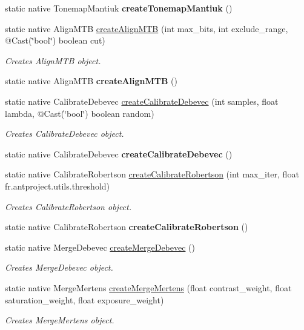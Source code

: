 \begin{DoxyCompactItemize}
static native Tonemap\+Mantiuk {\bfseries create\+Tonemap\+Mantiuk} ()
\item 
static native Align\+M\+TB \hyperlink{group__photo__hdr_ga07eeedb34057b6d4d7c8679fda18175f}{create\+Align\+M\+TB} (int max\+\_\+bits, int exclude\+\_\+range, @Cast(\char`\"{}bool\char`\"{}) boolean cut)
\begin{DoxyCompactList}\small\item\em Creates Align\+M\+TB object. \end{DoxyCompactList}\item 
static native Align\+M\+TB {\bfseries create\+Align\+M\+TB} ()
\item 
static native Calibrate\+Debevec \hyperlink{group__photo__hdr_gada8b25f072e80141d53f66754675dbec}{create\+Calibrate\+Debevec} (int samples, float lambda, @Cast(\char`\"{}bool\char`\"{}) boolean random)
\begin{DoxyCompactList}\small\item\em Creates Calibrate\+Debevec object. \end{DoxyCompactList}\item 
static native Calibrate\+Debevec {\bfseries create\+Calibrate\+Debevec} ()
\item 
static native Calibrate\+Robertson \hyperlink{group__photo__hdr_ga1ac32f0f1042b3436bd7daf88bb48760}{create\+Calibrate\+Robertson} (int max\+\_\+iter, float fr.antproject.utils.threshold)
\begin{DoxyCompactList}\small\item\em Creates Calibrate\+Robertson object. \end{DoxyCompactList}\item 
static native Calibrate\+Robertson {\bfseries create\+Calibrate\+Robertson} ()
\item 
static native Merge\+Debevec \hyperlink{group__photo__hdr_ga90dac3606f6344e591968df25cd8ace6}{create\+Merge\+Debevec} ()
\begin{DoxyCompactList}\small\item\em Creates Merge\+Debevec object. \end{DoxyCompactList}\item 
static native Merge\+Mertens \hyperlink{group__photo__hdr_ga7f47cc9c6b5e72f9fbf7281271dfc426}{create\+Merge\+Mertens} (float contrast\+\_\+weight, float saturation\+\_\+weight, float exposure\+\_\+weight)
\begin{DoxyCompactList}\small\item\em Creates Merge\+Mertens object. \end{DoxyCompactList}\item 

\end{DoxyCompactItemize}
